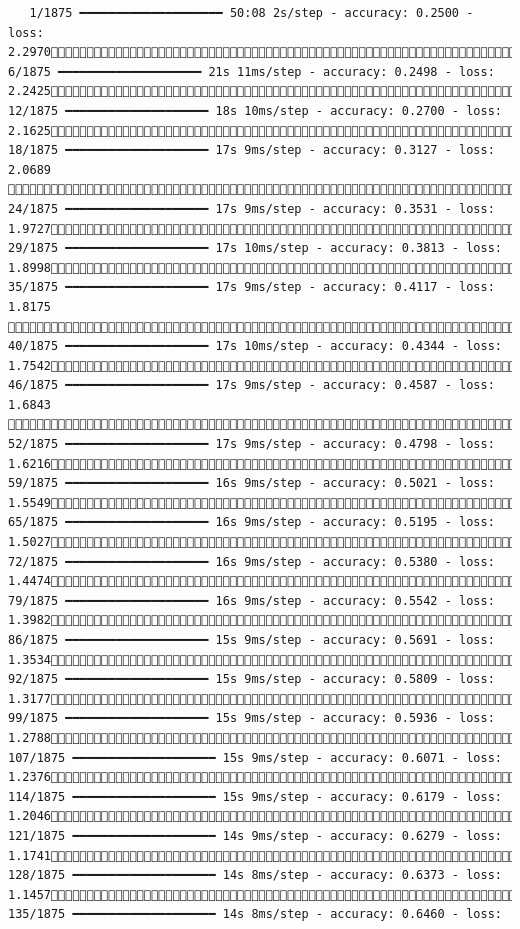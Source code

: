\documentclass[
  letterpaper,
  DIV=11,
  numbers=noendperiod]{scrreprt}
\begin{document}
\begin{verbatim}
   1/1875 ━━━━━━━━━━━━━━━━━━━━ 50:08 2s/step - accuracy: 0.2500 - loss: 2.2970   6/1875 ━━━━━━━━━━━━━━━━━━━━ 21s 11ms/step - accuracy: 0.2498 - loss: 2.2425  12/1875 ━━━━━━━━━━━━━━━━━━━━ 18s 10ms/step - accuracy: 0.2700 - loss: 2.1625  18/1875 ━━━━━━━━━━━━━━━━━━━━ 17s 9ms/step - accuracy: 0.3127 - loss: 2.0689   24/1875 ━━━━━━━━━━━━━━━━━━━━ 17s 9ms/step - accuracy: 0.3531 - loss: 1.9727  29/1875 ━━━━━━━━━━━━━━━━━━━━ 17s 10ms/step - accuracy: 0.3813 - loss: 1.8998  35/1875 ━━━━━━━━━━━━━━━━━━━━ 17s 9ms/step - accuracy: 0.4117 - loss: 1.8175   40/1875 ━━━━━━━━━━━━━━━━━━━━ 17s 10ms/step - accuracy: 0.4344 - loss: 1.7542  46/1875 ━━━━━━━━━━━━━━━━━━━━ 17s 9ms/step - accuracy: 0.4587 - loss: 1.6843   52/1875 ━━━━━━━━━━━━━━━━━━━━ 17s 9ms/step - accuracy: 0.4798 - loss: 1.6216  59/1875 ━━━━━━━━━━━━━━━━━━━━ 16s 9ms/step - accuracy: 0.5021 - loss: 1.5549  65/1875 ━━━━━━━━━━━━━━━━━━━━ 16s 9ms/step - accuracy: 0.5195 - loss: 1.5027  72/1875 ━━━━━━━━━━━━━━━━━━━━ 16s 9ms/step - accuracy: 0.5380 - loss: 1.4474  79/1875 ━━━━━━━━━━━━━━━━━━━━ 16s 9ms/step - accuracy: 0.5542 - loss: 1.3982  86/1875 ━━━━━━━━━━━━━━━━━━━━ 15s 9ms/step - accuracy: 0.5691 - loss: 1.3534  92/1875 ━━━━━━━━━━━━━━━━━━━━ 15s 9ms/step - accuracy: 0.5809 - loss: 1.3177  99/1875 ━━━━━━━━━━━━━━━━━━━━ 15s 9ms/step - accuracy: 0.5936 - loss: 1.2788 107/1875 ━━━━━━━━━━━━━━━━━━━━ 15s 9ms/step - accuracy: 0.6071 - loss: 1.2376 114/1875 ━━━━━━━━━━━━━━━━━━━━ 15s 9ms/step - accuracy: 0.6179 - loss: 1.2046 121/1875 ━━━━━━━━━━━━━━━━━━━━ 14s 9ms/step - accuracy: 0.6279 - loss: 1.1741 128/1875 ━━━━━━━━━━━━━━━━━━━━ 14s 8ms/step - accuracy: 0.6373 - loss: 1.1457 135/1875 ━━━━━━━━━━━━━━━━━━━━ 14s 8ms/step - accuracy: 0.6460 - loss: 
\end{verbatim}
\end{document}
